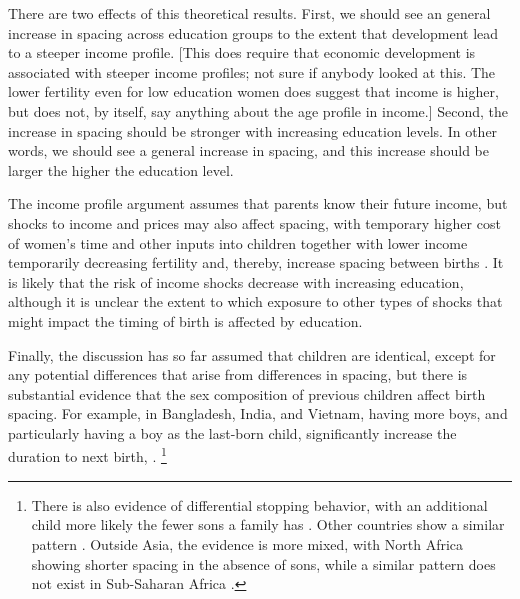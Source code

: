 There are two effects of this theoretical results.
First, we should see an general increase in spacing across education groups to the extent that
development lead to a steeper income profile.
[This does require that economic development is associated with steeper income profiles;
not sure if anybody looked at this.
The lower fertility even for low education women does suggest that income is higher,
but does not, by itself, say anything about the age profile in income.]
Second, the increase in spacing should be stronger with increasing education levels.
In other words, we should see a general increase in spacing, and this increase should be
larger the higher the education level.

The income profile argument assumes that parents know their future income, but 
shocks to income and prices may also affect spacing, with temporary higher cost of women's time
and other inputs into children together with lower income temporarily decreasing fertility 
and, thereby, increase spacing between births \citep{Moffitt1984,Hotz1988,Portner2001,Alam2018}.
It is likely that the risk of income shocks decrease with increasing education, although it
is unclear the extent to which exposure to other types of shocks that might impact the timing
of birth is affected by education.


Finally, the discussion has so far assumed that children are identical, except for any potential
differences that arise from differences in spacing, but there is substantial evidence that the 
sex composition of previous children affect birth spacing.
For example, in Bangladesh, India, and Vietnam, having more boys, and particularly having 
a boy as the last-born child, significantly increase the duration to next birth,
\citep{Haughton1995,Haughton1996,Rahman1993,Bhalotra2008,Kumar2016,Soest2018}.%
\footnote{
There is also evidence of differential stopping behavior, with an additional child more likely the
fewer sons a family has 
\citep{repetto72,Das1987,Arnold1997,arnold98,clark00,Basu2010,Barcellos2014}.%
Other countries show a similar pattern
\citep[see, for example,][]{larsen98,filmer09,Altindag2016}.
Outside Asia, the evidence is more mixed, with North Africa showing shorter spacing in the 
absence of sons, while a similar pattern does not exist in Sub-Saharan Africa 
\citep{Rossi2015}.
}

